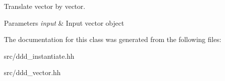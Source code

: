 Translate vector by vector. 


\begin{DoxyParams}{Parameters}
{\em input} & Input vector object \\
\hline
\end{DoxyParams}


The documentation for this class was generated from the following files\+:\begin{DoxyCompactItemize}
\item 
src/ddd\+\_\+instantiate.\+hh\item 
src/ddd\+\_\+vector.\+hh\end{DoxyCompactItemize}
